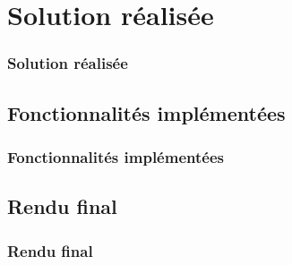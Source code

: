 \section{Solution r\'ealis\'ee}
\begin{frame}
 	\frametitle{Solution r\'ealis\'ee}
\end{frame}
\subsection{Fonctionnalit\'es impl\'ement\'ees}
\frame
{
\frametitle{Fonctionnalit\'es impl\'ement\'ees}


}

\subsection{Rendu final}
\frame
{
\frametitle{Rendu final}


}